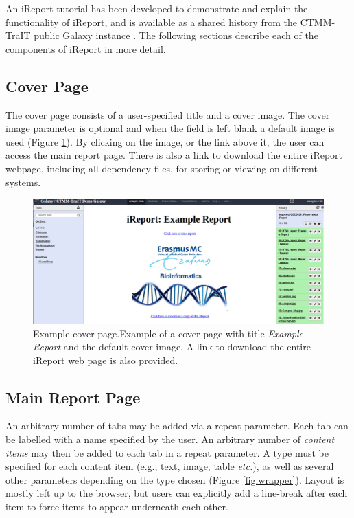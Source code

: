 An iReport tutorial has been developed to demonstrate and explain the functionality of iReport, and is available as a shared history from the CTMM-TraIT public Galaxy instance \cite{url-ireport-tutorial}. The following sections describe each of the components of iReport in more detail.

\subsection*{Cover Page}
The cover page consists of a user-specified title and a cover image. The cover image parameter is optional and when the field is left blank a default image is used (Figure \ref{fig:defaultcover}).
By clicking on the image, or the link above it, the user can access the main report page. There is also a link to download the entire iReport webpage, including all dependency files, for storing or viewing on different systems.

\begin{figure}[h!]
    \includegraphics[width=\textwidth]{chapters/images/iReport/Hiltemann_defaultcover.jpg}
    \caption{Example cover page.Example of a cover page with title \emph{Example Report} and the default cover image. A link to download the entire iReport web page is also provided.}
    \label{fig:defaultcover}
\end{figure}


\subsection*{Main Report Page}
An arbitrary number of tabs may be added via a repeat parameter. Each tab can be labelled with a name specified by the user. An arbitrary number of \emph{content items} may then be added to each tab in a repeat parameter. A type must be specified for each content item (e.g., text, image, table \emph{etc.}), as well as several other parameters depending on the type chosen (Figure \ref{fig:wrapper}). Layout is mostly left up to the browser, but users can explicitly add a line-break after each item to force items to appear underneath each other.

